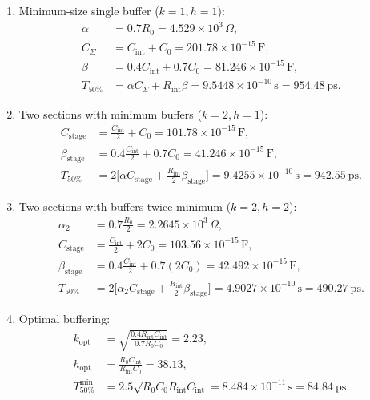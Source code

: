 \documentclass[11pt]{article}
\begin{document}
\begin{enumerate}[label=\bfseries\alph*), itemsep=2ex]
    \item Minimum-size single buffer ($k=1, h=1$):
    \begin{align*}
    \alpha &= 0.7 R_0 = 4.529\times10^{3}\,\Omega,\\
    C_{\Sigma} &= C_{\text{int}} + C_0 = 201.78\times10^{-15}\,\text{F},\\
    \beta &= 0.4 C_{\text{int}} + 0.7 C_0 = 81.246\times10^{-15}\,\text{F},\\
    T_{50\%} &= \alpha C_{\Sigma} + R_{\text{int}} \beta = 9.5448\times10^{-10}\,\text{s} = 954.48~\text{ps}.
    \end{align*}

    \item Two sections with minimum buffers ($k=2, h=1$):
    \begin{align*}
    C_{\text{stage}} &= \frac{C_{\text{int}}}{2} + C_0 = 101.78\times10^{-15}\,\text{F},\\
    \beta_{\text{stage}} &= 0.4\frac{C_{\text{int}}}{2} + 0.7 C_0 = 41.246\times10^{-15}\,\text{F},\\
    T_{50\%} &= 2\Big[\alpha C_{\text{stage}} + \frac{R_{\text{int}}}{2} \beta_{\text{stage}}\Big] = 9.4255\times10^{-10}\,\text{s} = 942.55~\text{ps}.
    \end{align*}

    \item Two sections with buffers twice minimum ($k=2, h=2$):
    \begin{align*}
    \alpha_2 &= 0.7 \frac{R_0}{2} = 2.2645\times10^{3}\,\Omega,\\
    C_{\text{stage}} &= \frac{C_{\text{int}}}{2} + 2 C_0 = 103.56\times10^{-15}\,\text{F},\\
    \beta_{\text{stage}} &= 0.4\frac{C_{\text{int}}}{2} + 0.7 (2 C_0) = 42.492\times10^{-15}\,\text{F},\\
    T_{50\%} &= 2\Big[\alpha_2 C_{\text{stage}} + \frac{R_{\text{int}}}{2} \beta_{\text{stage}}\Big] = 4.9027\times10^{-10}\,\text{s} = 490.27~\text{ps}.
    \end{align*}

    \item Optimal buffering:
    \begin{align*}
    k_{\text{opt}} &= \sqrt{\frac{0.4 R_{\text{int}} C_{\text{int}}}{0.7 R_0 C_0}} = 2.23,\\
    h_{\text{opt}} &= \frac{R_0 C_{\text{int}}}{R_{\text{int}} C_0} = 38.13,\\
    T_{50\%}^{\text{min}} &= 2.5 \sqrt{R_0 C_0 R_{\text{int}} C_{\text{int}}} = 8.484\times10^{-11}\,\text{s} = 84.84~\text{ps}.
    \end{align*}
\end{enumerate}
\end{document}
